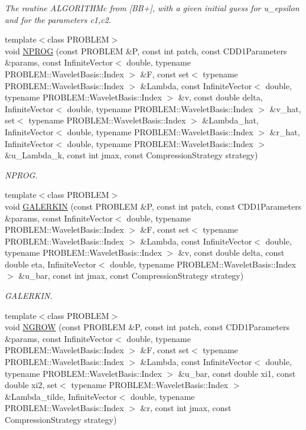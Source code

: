 \begin{CompactItemize}
\begin{CompactList}\small\item\em The routine ALGORITHMc from \mbox{[}BB+\mbox{]}, with a given initial guess for u\_\-epsilon and for the parameters c1,c2. \item\end{CompactList}\item 
{\footnotesize template$<$class PROBLEM$>$ }\\void \hyperlink{namespaceFrameTL_d25b2eb9873b17224cdc0ddc9b0d04b1}{NPROG} (const PROBLEM \&P, const int patch, const CDD1Parameters \&params, const InfiniteVector$<$ double, typename PROBLEM::WaveletBasis::Index $>$ \&F, const set$<$ typename PROBLEM::WaveletBasis::Index $>$ \&Lambda, const InfiniteVector$<$ double, typename PROBLEM::WaveletBasis::Index $>$ \&v, const double delta, InfiniteVector$<$ double, typename PROBLEM::WaveletBasis::Index $>$ \&v\_\-hat, set$<$ typename PROBLEM::WaveletBasis::Index $>$ \&Lambda\_\-hat, InfiniteVector$<$ double, typename PROBLEM::WaveletBasis::Index $>$ \&r\_\-hat, InfiniteVector$<$ double, typename PROBLEM::WaveletBasis::Index $>$ \&u\_\-Lambda\_\-k, const int jmax, const CompressionStrategy strategy)
\begin{CompactList}\small\item\em NPROG. \item\end{CompactList}\item 
{\footnotesize template$<$class PROBLEM$>$ }\\void \hyperlink{namespaceFrameTL_5338ae7f2ce93a8449560cc020fa212a}{GALERKIN} (const PROBLEM \&P, const int patch, const CDD1Parameters \&params, const InfiniteVector$<$ double, typename PROBLEM::WaveletBasis::Index $>$ \&F, const set$<$ typename PROBLEM::WaveletBasis::Index $>$ \&Lambda, const InfiniteVector$<$ double, typename PROBLEM::WaveletBasis::Index $>$ \&v, const double delta, const double eta, InfiniteVector$<$ double, typename PROBLEM::WaveletBasis::Index $>$ \&u\_\-bar, const int jmax, const CompressionStrategy strategy)
\begin{CompactList}\small\item\em GALERKIN. \item\end{CompactList}\item 
{\footnotesize template$<$class PROBLEM$>$ }\\void \hyperlink{namespaceFrameTL_f3d9112d64f468a664317686725617bd}{NGROW} (const PROBLEM \&P, const int patch, const CDD1Parameters \&params, const InfiniteVector$<$ double, typename PROBLEM::WaveletBasis::Index $>$ \&F, const set$<$ typename PROBLEM::WaveletBasis::Index $>$ \&Lambda, const InfiniteVector$<$ double, typename PROBLEM::WaveletBasis::Index $>$ \&u\_\-bar, const double xi1, const double xi2, set$<$ typename PROBLEM::WaveletBasis::Index $>$ \&Lambda\_\-tilde, InfiniteVector$<$ double, typename PROBLEM::WaveletBasis::Index $>$ \&r, const int jmax, const CompressionStrategy strategy)

\end{CompactItemize}
